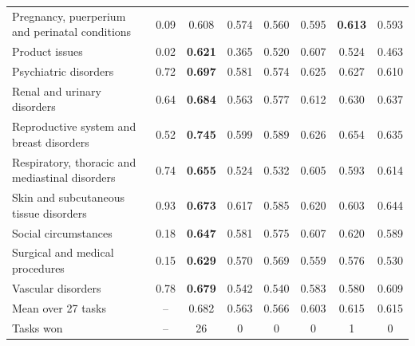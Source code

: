 \begin{tabular}{lccccccc}
Pregnancy, puerperium and perinatal conditions & 0.09 & 0.608 & 0.574 & 0.560 & 0.595 & \textbf{0.613} & 0.593 \\
Product issues & 0.02 & \textbf{0.621} & 0.365 & 0.520 & 0.607 & 0.524 & 0.463 \\
Psychiatric disorders & 0.72 & \textbf{0.697} & 0.581 & 0.574 & 0.625 & 0.627 & 0.610 \\
Renal and urinary disorders & 0.64 & \textbf{0.684} & 0.563 & 0.577 & 0.612 & 0.630 & 0.637 \\
Reproductive system and breast disorders & 0.52 & \textbf{0.745} & 0.599 & 0.589 & 0.626 & 0.654 & 0.635 \\
Respiratory, thoracic and mediastinal disorders & 0.74 & \textbf{0.655} & 0.524 & 0.532 & 0.605 & 0.593 & 0.614 \\
Skin and subcutaneous tissue disorders & 0.93 & \textbf{0.673} & 0.617 & 0.585 & 0.620 & 0.603 & 0.644 \\
Social circumstances & 0.18 & \textbf{0.647} & 0.581 & 0.575 & 0.607 & 0.620 & 0.589 \\
Surgical and medical procedures & 0.15 & \textbf{0.629} & 0.570 & 0.569 & 0.559 & 0.576 & 0.530 \\
Vascular disorders & 0.78 & \textbf{0.679} & 0.542 & 0.540 & 0.583 & 0.580 & 0.609 \\
\midrule
Mean over 27 tasks & -- & 0.682 & 0.563 & 0.566 & 0.603 & 0.615 & 0.615 \\
Tasks won & -- & 26 & 0 & 0 & 0 & 1 & 0 \\
\bottomrule
\end{tabular}